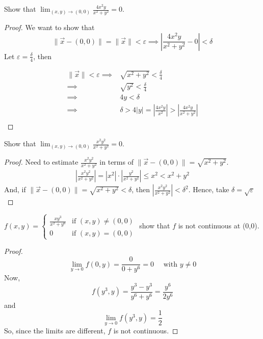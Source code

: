 \documentclass[12pt]{book}
\theoremstyle{definition}
\theoremstyle{remark}
\begin{document}
\begin{example}
  Show that $\lim_{(x,y)\rightarrow (0,0)}\frac{4x^2y}{x^2+y^2} = 0$. 
  \begin{proof}
    We want to show that $$\|\vec{{x}} -(0,0)\| = \| \vec{{x}} \| <\varepsilon \implies \left| \frac{4x^2y}{x^2 + y^2}-0\right|<\delta $$
  Let $\varepsilon = \frac{\delta}{4}$, then

\begin{equation*}
	\begin{split}
	   \|\vec{{x}} \| < \varepsilon \implies &  \sqrt{x^2 + y^2}<\frac{\delta}{4} \\ 
    \implies & \sqrt{y^2} < \frac{\delta}{4} \\ 
   	\implies & 4y < \delta\\
    \implies & \delta > 4|y| = \left|\frac{4x^2y}{x^2} \right| > \left|\frac{4x^2y}{x^2+ y^2} \right| \\
	\end{split}
\end{equation*}
  \end{proof}
  \end{example}
  \begin{example} 
    Show that $\lim_{(x,y) \rightarrow (0,0)} \frac{x^2y^2}{x^2+y^2} = 0$. 
    \begin{proof} 
      Need to estimate $\frac{x^2y^2}{x^2 + y^2} $ in terms of $\| \vec{{x}} -(0,0)\| = \sqrt{x^2 + y^2}$. 
      \begin{equation*}
        \begin{split}
          \left| \frac{x^2y^2}{x^2 + y^2}\right| = |x^2 | \cdot \left| \frac{y^2}{x^2 +y^2}\right| \leq x^2 < x^2 +y^2
        \end{split}
      \end{equation*}
      And, if $\| \vec{{x}} -(0,0) \| = \sqrt{x^2 +y^2} < \delta$, then $\left| \frac{x^2y^2}{x^2 +y^2}\right|< \delta^2$. Hence, take $\delta = \sqrt{\varepsilon}$
    \end{proof}
    
  \end{example}
  \begin{example}
    $f(x,y) = \left\{ \begin{matrix} \frac{xy^3}{x^2 +y^6} & \text{if } (x,y) \neq (0,0) \\ 
      0 & \text{if } (x,y) = (0,0)
    \end{matrix}
      \right. $
      show that $f$ is not continuous at (0,0). 
      \begin{proof} 
        $$ \lim_{y \rightarrow 0} f(0,y) = \frac{0}{0+y^6} = 0 \quad \text{ with  }y \neq 0 $$
        Now, 
        $$f(y^3, y) = \frac{y^3-y^3}{y^6+y^6} =\frac{y^6}{2y^6}  $$
        and $$\lim_{y \rightarrow 0} f(y^3,y) =\frac{1}{2}  $$
        So, since the limits are different, $f$ is not continuous. 
      \end{proof} 
  \end{example}
\end{document}
